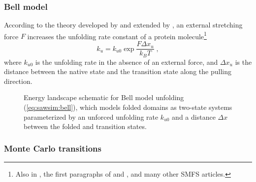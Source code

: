 \subsubsection{Bell model}
\label{sec:sawsim:rate:bell}

According to the theory developed by \citet{bell78} and extended by
\citet{evans99}, an external stretching force $F$ increases the
unfolding rate constant of a protein molecule\footnote{
  Also in , the first paragraphs of
  \citet{dudko06} and \citet{dudko07}, and many other SMFS articles.
}
\begin{equation}
  k_u = k_{u0} \exp{\frac{F\Delta x_u}{k_B T}} \;, \label{eq:sawsim:bell}
\end{equation}
where $k_{u0}$ is the unfolding rate in the absence of an external
force, and $\Delta x_u$ is the distance between the native state and
the transition state along the pulling direction.
%

\begin{figure}
  \caption{Energy landscape schematic for Bell model unfolding
    (\cref{eq:sawsim:bell}), which models folded domains as two-state
    systems parameterized by an unforced unfolding rate $k_{u0}$ and a
    distance $\Delta x$ between the folded and transition
    states.\label{fig:bell-landscape}}
\end{figure}

\subsubsection{Monte Carlo transitions}
\label{sec:sawsim:monte-carlo}

